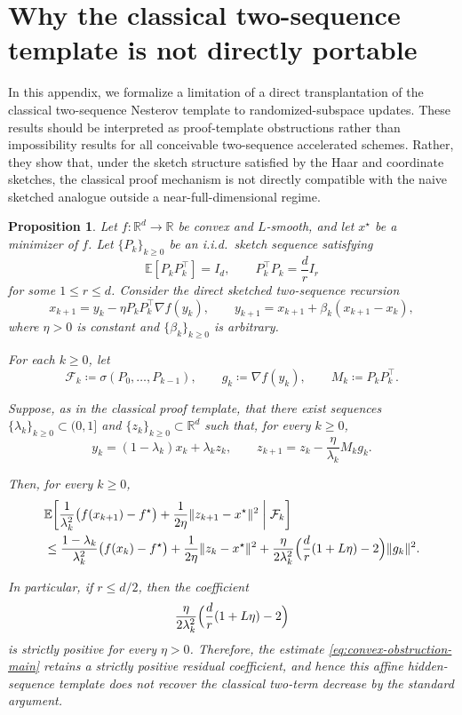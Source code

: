 \documentclass[10pt]{article}
\newtheorem{proposition}[proposition]{Proposition}
\newcommand{\E}{\mathbb{E}}
\newcommand{\F}{\mathcal{F}}
\newcommand{\R}{\mathbb{R}}
\begin{document}
\section{Why the classical two-sequence template is not directly portable}
\label{app:two-sequence-obstruction}

In this appendix, we formalize a limitation of a direct transplantation of the
classical two-sequence Nesterov template to randomized-subspace updates.
These results should be interpreted as proof-template obstructions rather than impossibility
results for all conceivable two-sequence accelerated schemes.
Rather, they show that, under the sketch structure satisfied by the Haar and coordinate sketches,
the classical proof mechanism is not directly compatible with the naive sketched analogue
outside a near-full-dimensional regime.


\begin{proposition}
\label{prop:convex-two-seq-obstruction}
Let \(f:\R^d\to\R\) be convex and \(L\)-smooth, and let \(x^\star\) be a minimizer of \(f\).
Let \(\{P_k\}_{k\ge 0}\) be an i.i.d.\ sketch sequence satisfying
\[
\E[P_kP_k^\top]=I_d,
\qquad
P_k^\top P_k=\frac{d}{r}I_r
\]
for some \(1\le r\le d\).
Consider the direct sketched two-sequence recursion
\[
x_{k+1}=y_k-\eta P_kP_k^\top \nabla f(y_k),
\qquad
y_{k+1}=x_{k+1}+\beta_k(x_{k+1}-x_k),
\]
where \(\eta>0\) is constant and \(\{\beta_k\}_{k\ge 0}\) is arbitrary.

For each \(k\ge0\), let
\[
\F_k\coloneqq \sigma(P_0,\dots,P_{k-1}),
\qquad
g_k\coloneqq \nabla f(y_k),
\qquad
M_k\coloneqq P_kP_k^\top.
\]

Suppose, as in the classical proof template, that there exist sequences
\(\{\lambda_k\}_{k\ge0}\subset(0,1]\) and
\(\{z_k\}_{k\ge0}\subset\R^d\) such that, for every \(k\ge0\),
\begin{equation}
y_k=(1-\lambda_k)x_k+\lambda_k z_k,
\qquad
z_{k+1}=z_k-\frac{\eta}{\lambda_k}M_k g_k.
\label{eq:convex-obstruction-affine}
\end{equation}



Then, for every \(k\ge0\),
\begin{align}
&\E\!\left[
\frac{1}{\lambda_k^2}\bigl(f(x_{k+1})-f^\star\bigr)
+\frac{1}{2\eta}\|z_{k+1}-x^\star\|^2
\;\middle|\; \F_k
\right]
\notag\\
&\le
\frac{1-\lambda_k}{\lambda_k^2}\bigl(f(x_k)-f^\star\bigr)
+\frac{1}{2\eta}\|z_k-x^\star\|^2
+\frac{\eta}{2\lambda_k^2}
\Bigl(
\frac{d}{r}(1+L\eta)-2
\Bigr)\|g_k\|^2.
\label{eq:convex-obstruction-main} 
\end{align}

In particular, if \(r\le d/2\), then the coefficient
\[
\frac{\eta}{2\lambda_k^2}
\Bigl(
\frac{d}{r}(1+L\eta)-2
\Bigr)
\]
is strictly positive for every \(\eta>0\).
Therefore, the estimate \eqref{eq:convex-obstruction-main} retains a strictly positive residual coefficient, and hence this affine hidden-sequence template does not recover the classical two-term decrease by the standard argument.
\end{proposition}
\end{document}
